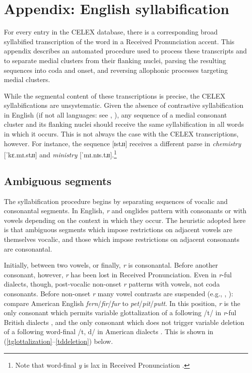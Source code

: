 \documentclass[12pt]{article}
\begin{document}
\section{Appendix: English syllabification}
\label{syllabification}

For every entry in the CELEX database, there is a corresponding broad syllabified transcription of the word in a Received Pronunciation accent. This appendix describes an automated procedure used to process these transcripts and to separate medial clusters from their flanking nuclei, parsing the resulting sequences into coda and onset, and reversing allophonic processes targeting medial clusters.

While the segmental content of these transcriptions is precise, the CELEX syllabifications are unsystematic. Given the absence of contrastive syllabification in English (if not all languages: see \citealp[221]{Blevins1995}, \citealp{Elfner2006}), any sequence of a medial consonant cluster and its flanking nuclei should receive the same syllabification in all words in which it occurs. This is not always the case with the CELEX transcriptions, however. For instance, the sequence [ɪstɹɪ] receives a different parse in \emph{chemistry} [ˈkɛ.mɪ.stɹɪ] and \emph{ministry} [ˈmɪ.nɪs.tɹɪ].\footnote{Note that word-final \emph{y} is lax in Received Pronunciation \citep[][II.294]{AOE}.}

\subsection{Ambiguous segments}

The syllabification procedure begins by separating sequences of vocalic and consonantal segments. In English, \emph{r} and onglides pattern with consonants or with vowels depending on the context in which they occur. The heuristic adopted here is that ambiguous segments which impose restrictions on adjacent vowels are themselves vocalic, and those which impose restrictions on adjacent consonants are consonantal.

Initially, between two vowels, or finally, \emph{r} is consonantal. Before another consonant, however, \emph{r} has been lost in Received Pronunciation. Even in \emph{r}-ful dialects, though, post-vocalic non-onset \emph{r} patterns with vowels, not coda consonants. Before non-onset \emph{r} many vowel contrasts are suspended (e.g., \citealp[269f.]{Fudge1969}, \citealp[][255]{Harris1994}): compare American English \emph{fern}/\emph{fir}/\emph{fur} to \emph{pet}/\emph{pit}/\emph{putt}. In this position, \emph{r} is the only consonant which permits variable glottalization of a following /t/ in \emph{r}-ful British dialects \citep[258]{Harris1994}, and the only consonant which does not trigger variable deletion of a following word-final /t, d/ in American dialects \citep[8]{Guy1980}. This is shown in (\ref{tglottalization}--\ref{tddeletion}) below.
\end{document}
